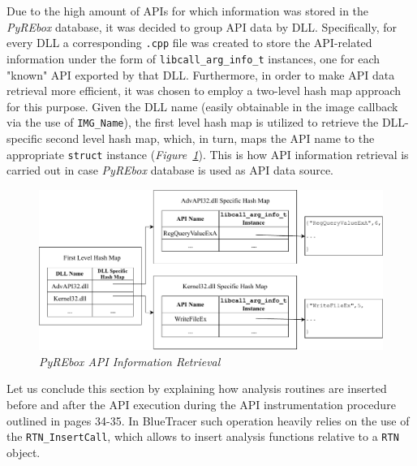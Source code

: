 Due to the high amount of APIs for which information was stored in the \textit{PyREbox} database, it was decided to group API data by DLL. Specifically, for every DLL a corresponding \texttt{.cpp} file was created to store the API-related information under the form of \texttt{libcall\_arg\_info\_t} instances, one for each "known" API exported by that DLL. Furthermore, in order to make API data retrieval more efficient, it was chosen to employ a two-level hash map approach for this purpose. Given the DLL name (easily obtainable in the image callback via the use of \texttt{IMG\_Name}), the first level hash map is utilized to retrieve the DLL-specific second level hash map, which, in turn, maps the API name to the appropriate \texttt{struct} instance (\textit{Figure~\ref{Hashmap}}). This is how API information retrieval is carried out in case \textit{PyREbox} database is used as API data source.
\begin{figure}[h]
\centering
\vspace{0.5cm}
\includegraphics[width=1\textwidth]{Figures/HashMap.pdf}
\caption{\textit{PyREbox API Information Retrieval}}
\label{Hashmap}
\end{figure}

Let us conclude this section by explaining how analysis routines are inserted before and after the API execution during the API instrumentation procedure outlined in pages 34-35. In BlueTracer such operation heavily relies on the use of the \texttt{RTN\_InsertCall}, which allows to insert analysis functions relative to a \texttt{RTN} object. 

